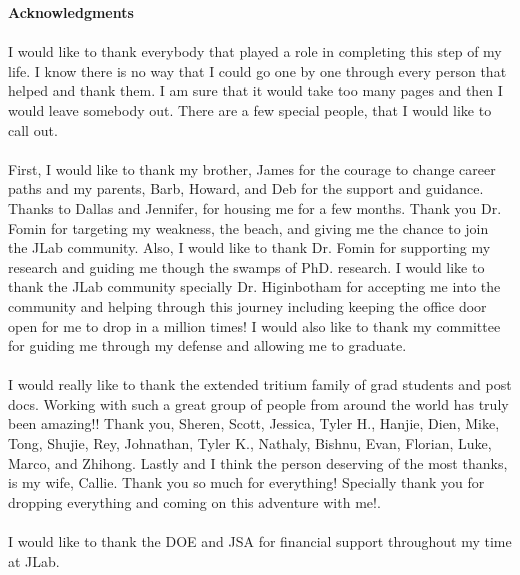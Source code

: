 \begin{center}
	{\large \textbf{Acknowledgments}}\\
\end{center}

\paragraph{}I would like to thank everybody that played a role in completing this step of my life. I know there is no way that I could go one by one through every person that helped and thank them. I am sure that it would take too many pages and then I would leave somebody out. There are a few special people, that I would like to call out. 
\paragraph{}First, I would like to thank my brother, James for the courage to change career paths and my parents, Barb, Howard, and Deb for the support and guidance. Thanks to Dallas and Jennifer, for housing me for a few months. Thank you Dr. Fomin for targeting my weakness, the beach, and giving me the chance to join the JLab community. Also, I would like to thank Dr. Fomin for supporting my research and guiding me though the swamps of PhD. research. I would like to thank the JLab community specially Dr. Higinbotham for accepting me into the community and helping through this journey including keeping the office door open for me to drop in a million times! I would also like to thank my committee for guiding me through my defense and allowing me to graduate. 
\paragraph{}I would really like to thank the extended tritium family of grad students and post docs. Working with such a great group of people from around the world has truly been amazing!! Thank you, Sheren, Scott, Jessica, Tyler H., Hanjie, Dien, Mike, Tong, Shujie, Rey, Johnathan, Tyler K., Nathaly, Bishnu, Evan, Florian, Luke, Marco, and Zhihong. Lastly and I think the person deserving of the most thanks, is my wife, Callie. Thank you so much for everything! Specially thank you for dropping everything and coming on this adventure with me!.

\paragraph{}I would like to thank the DOE and JSA for financial support throughout my time at JLab. 